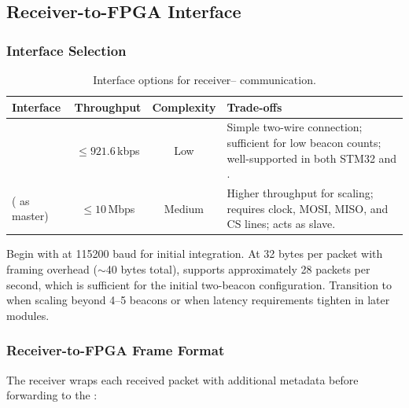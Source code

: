 \documentclass[11pt,letterpaper]{article}
\begin{document}
	\subsection{Receiver-to-FPGA Interface}
	
	\subsubsection{Interface Selection}
	
	\begin{table}[ht!]
		\centering
		\caption{Interface options for receiver--\FPGA{} communication.}
		\label{tab:interface}
		\renewcommand{\arraystretch}{1.3}
		\begin{tabularx}{\textwidth}{l c c X}
			\toprule
			\textbf{Interface} & \textbf{Throughput} & \textbf{Complexity} & \textbf{Trade-offs} \\
			\midrule
			\UART{} & $\leq 921.6$\,kbps & Low & Simple two-wire connection; sufficient for low beacon counts; well-supported in both STM32 \HAL{} and \VHDL{}. \\
			\SPI{} (\MCU{} as master) & $\leq 10$\,Mbps & Medium & Higher throughput for scaling; requires clock, MOSI, MISO, and CS lines; \FPGA{} acts as \SPI{} slave. \\
			\bottomrule
		\end{tabularx}
	\end{table}
	
	\begin{tcolorbox}[infobox={Recommendation}]
		Begin with \UART{} at 115200 baud for initial integration. At 32 bytes per packet with framing overhead ($\sim$40 bytes total), \UART{} supports approximately 28 packets per second, which is sufficient for the initial two-beacon configuration. Transition to \SPI{} when scaling beyond 4--5 beacons or when latency requirements tighten in later modules.
	\end{tcolorbox}
	
	\subsubsection{Receiver-to-FPGA Frame Format}
	
	The receiver wraps each received packet with additional metadata before forwarding to the \FPGA{}:
	
\end{document}
